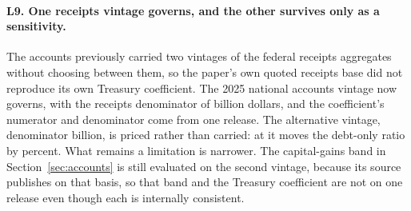 \paragraph{L9. One receipts vintage governs, and the other survives only as a sensitivity.} The
accounts previously carried two vintages of the federal receipts aggregates without choosing
between them, so the paper's own quoted receipts base did not reproduce its own Treasury
coefficient. The 2025 national accounts vintage now governs, with the receipts denominator of
 billion dollars, and the coefficient's numerator and denominator come
from one release. The alternative vintage, denominator  billion, is priced
rather than carried: at  it moves the debt-only ratio by
 percent. What remains a limitation is narrower. The capital-gains band
in Section~\ref{sec:accounts} is still evaluated on the second vintage, because its source
publishes on that basis, so that band and the Treasury coefficient are not on one release even
though each is internally consistent.
